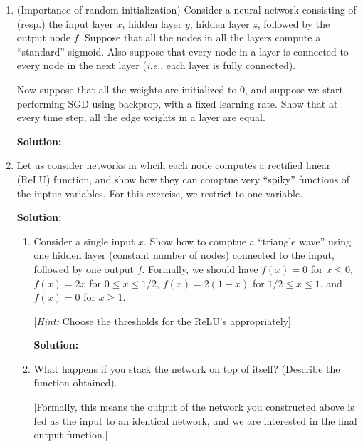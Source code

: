 \documentclass[12pt]{article}
\newcommand{\BigO}[1]{\mathcal{O}\left( #1 \right)}
\begin{document}
\begin{enumerate}
\begin{enumerate}

   {\bf Solution:}

\item Use these to show that the VC dimension of the class of binary-weight, threshold neural networks is $\BigO{(m+n)\log(n)}$.

   {\bf Solution:}

\end{enumerate}

\item (Importance of random initialization) Consider a neural network consisting of (resp.) the input layer $x$, hidden layer $y$, hidden layer $z$, followed by the output node $f$. Suppose that all the nodes in all the layers compute a ``standard'' sigmoid. Also suppose that every node in a layer is connected to every node in the next layer ({\em i.e.}, each layer is fully connected).

Now suppose that all the weights are initialized to $0$, and suppose we start performing SGD using backprop, with a fixed learning rate. Show that at every time step, all the edge weights in a layer are equal.

   {\bf Solution:}

\item Let us consider networks in whcih each node computes a rectified linear (ReLU) function, and show how they can comptue very ``spiky'' functions of the inptue variables. For this exercise, we restrict to one-variable.

   {\bf Solution:}

\begin{enumerate}
  \item Consider a single input $x$. Show how to comptue a ``triangle wave'' using one hidden layer (constant number of nodes) connected to the input, followed by one output $f$. Formally, we should have $f(x) = 0$ for $x \leq 0$, $f(x) = 2x$ for $0 \leq x \leq 1/2$, $f(x) = 2(1-x)$ for $1/2 \leq x \leq 1$, and $f(x) = 0$ for $x \geq 1$. 

[{\em Hint:} Choose the thresholds for the ReLU's appropriately]

   {\bf Solution:}

\item What happens if you stack the network on top of itself? (Describe the function obtained). 

[Formally, this means the output of the network you constructed above is fed as the input to an identical network, and we are interested in the final output function.]


\end{enumerate}
\end{enumerate}
\end{document}
